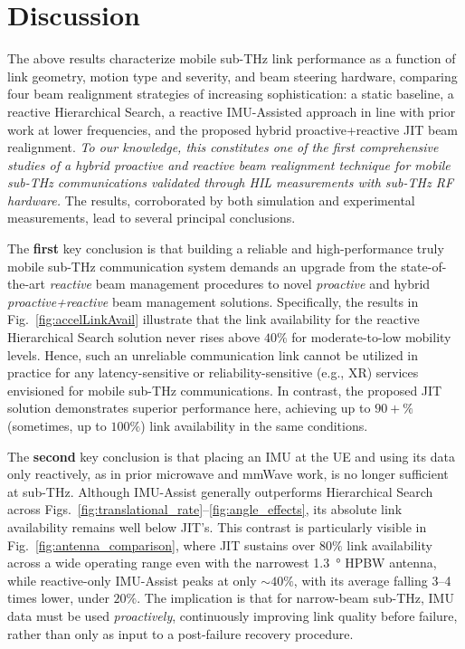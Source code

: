 \documentclass[fleqn,10pt]{wlscirep}
\begin{document}
\section*{Discussion}

The above results characterize mobile sub-THz link performance as a function of link geometry, motion type and severity, and beam steering hardware, comparing four beam realignment strategies of increasing sophistication: a static baseline, a reactive Hierarchical Search, a reactive IMU-Assisted approach in line with prior work at lower frequencies\cite{s141019622, Brambilla_2019}, and the proposed hybrid proactive+reactive JIT beam realignment. \emph{To our knowledge, this constitutes one of the first comprehensive studies of a hybrid proactive and reactive beam realignment technique for mobile sub-THz communications validated through HIL measurements with sub-THz RF hardware.} The results, corroborated by both simulation and experimental measurements, lead to several principal conclusions.

The \textbf{first} key conclusion is that building a reliable and high-performance truly mobile sub-THz communication system demands an upgrade from the state-of-the-art \emph{reactive} beam management procedures to novel \emph{proactive} and hybrid \emph{proactive+reactive} beam management solutions. Specifically, the results in Fig.~\ref{fig:accelLinkAvail} illustrate that the link availability for the reactive Hierarchical Search solution never rises above $40\%$ for moderate-to-low mobility levels. Hence, such an unreliable communication link cannot be utilized in practice for any latency-sensitive or reliability-sensitive (e.g., XR) services envisioned for mobile sub-THz communications. In contrast, the proposed JIT solution demonstrates superior performance here, achieving up to $90+\%$ (sometimes, up to $100\%$) link availability in the same conditions.

The \textbf{second} key conclusion is that placing an IMU at the UE and using its data only reactively, as in prior microwave and mmWave work, is no longer sufficient at sub-THz. Although IMU-Assist generally outperforms Hierarchical Search across Figs.~\ref{fig:translational_rate}--\ref{fig:angle_effects}, its absolute link availability remains well below JIT's. This contrast is particularly visible in Fig.~\ref{fig:antenna_comparison}, where JIT sustains over $80\%$ link availability across a wide operating range even with the narrowest \SI{1.3}{\degree} HPBW antenna, while reactive-only IMU-Assist peaks at only ${\sim}40\%$, with its average falling 3--4 times lower, under $20\%$. The implication is that for narrow-beam sub-THz, IMU data must be used \emph{proactively}, continuously improving link quality before failure, rather than only as input to a post-failure recovery procedure.
\end{document}
